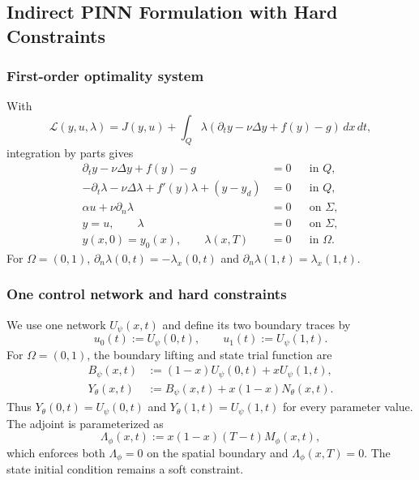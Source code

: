\subsection{Indirect PINN Formulation with Hard Constraints}

\subsubsection{First-order optimality system}

With
\begin{equation}
\mathcal{L}(y,u,\lambda)=J(y,u)+\int_Q\lambda\left(\partial_ty-\nu\Delta y+f(y)-g\right)\,dx\,dt,
\end{equation}
integration by parts gives
\begin{align}
\partial_ty-\nu\Delta y+f(y)-g&=0 &&\text{in }Q, \label{eq:state_opt}\\
-\partial_t\lambda-\nu\Delta\lambda+f'(y)\lambda+(y-y_d)&=0 &&\text{in }Q, \label{eq:adjoint}\\
\alpha u+\nu\partial_n\lambda&=0 &&\text{on }\Sigma, \label{eq:stationarity}\\
y=u,\qquad \lambda&=0 &&\text{on }\Sigma, \label{eq:bc_y}\\
y(x,0)=y_0(x),\qquad \lambda(x,T)&=0 &&\text{in }\Omega. \label{eq:terminal}
\end{align}
For $\Omega=(0,1)$, $\partial_n\lambda(0,t)=-\lambda_x(0,t)$ and $\partial_n\lambda(1,t)=\lambda_x(1,t)$.

\subsubsection{One control network and hard constraints}

We use one network $U_\psi(x,t)$ and define its two boundary traces by
\begin{equation}
u_0(t):=U_\psi(0,t),\qquad u_1(t):=U_\psi(1,t).
\end{equation}
For $\Omega=(0,1)$, the boundary lifting and state trial function are
\begin{align}
B_\psi(x,t)&:=(1-x)U_\psi(0,t)+xU_\psi(1,t),\\
Y_\theta(x,t)&:=B_\psi(x,t)+x(1-x)N_\theta(x,t). \label{eq:hard_state}
\end{align}
Thus $Y_\theta(0,t)=U_\psi(0,t)$ and $Y_\theta(1,t)=U_\psi(1,t)$ for every parameter value. The adjoint is parameterized as
\begin{equation}
\Lambda_\phi(x,t):=x(1-x)(T-t)M_\phi(x,t), \label{eq:hard_adjoint}
\end{equation}
which enforces both $\Lambda_\phi=0$ on the spatial boundary and $\Lambda_\phi(x,T)=0$. The state initial condition remains a soft constraint.

